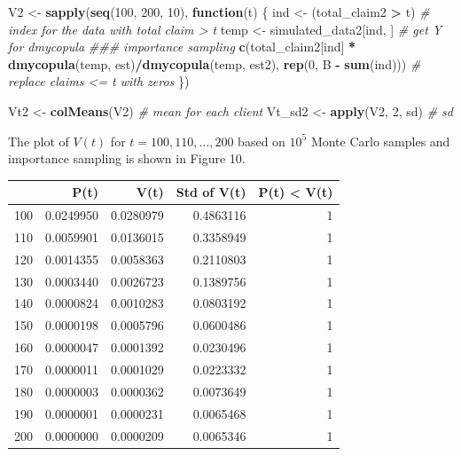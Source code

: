 \documentclass[11pt,]{article}
\newenvironment{Shaded}{\begin{snugshade}}{\end{snugshade}}
\newcommand{\CommentTok}[1]{\textcolor[rgb]{0.56,0.35,0.01}{\textit{#1}}}
\newcommand{\ControlFlowTok}[1]{\textcolor[rgb]{0.13,0.29,0.53}{\textbf{#1}}}
\newcommand{\DecValTok}[1]{\textcolor[rgb]{0.00,0.00,0.81}{#1}}
\newcommand{\KeywordTok}[1]{\textcolor[rgb]{0.13,0.29,0.53}{\textbf{#1}}}
\newcommand{\NormalTok}[1]{#1}
\newcommand{\OperatorTok}[1]{\textcolor[rgb]{0.81,0.36,0.00}{\textbf{#1}}}
\newcommand{\StringTok}[1]{\textcolor[rgb]{0.31,0.60,0.02}{#1}}
\begin{document}
\begin{Shaded}
\begin{Highlighting}[]
\NormalTok{V2 <-}\StringTok{ }\KeywordTok{sapply}\NormalTok{(}\KeywordTok{seq}\NormalTok{(}\DecValTok{100}\NormalTok{, }\DecValTok{200}\NormalTok{, }\DecValTok{10}\NormalTok{), }\ControlFlowTok{function}\NormalTok{(t) \{}
\NormalTok{    ind <-}\StringTok{ }\NormalTok{(total_claim2 }\OperatorTok{>}\StringTok{ }\NormalTok{t)  }\CommentTok{# index for the data with total claim > t}
\NormalTok{    temp <-}\StringTok{ }\NormalTok{simulated_data2[ind, ]  }\CommentTok{# get Y for dmycopula}
    \CommentTok{### importance sampling}
    \KeywordTok{c}\NormalTok{(total_claim2[ind] }\OperatorTok{*}\StringTok{ }\KeywordTok{dmycopula}\NormalTok{(temp, est)}\OperatorTok{/}\KeywordTok{dmycopula}\NormalTok{(temp, est2), }\KeywordTok{rep}\NormalTok{(}\DecValTok{0}\NormalTok{, }
\NormalTok{        B }\OperatorTok{-}\StringTok{ }\KeywordTok{sum}\NormalTok{(ind)))  }\CommentTok{# replace claims <= t with zeros}
\NormalTok{\})}

\NormalTok{Vt2 <-}\StringTok{ }\KeywordTok{colMeans}\NormalTok{(V2)  }\CommentTok{# mean for each client}
\NormalTok{Vt_sd2 <-}\StringTok{ }\KeywordTok{apply}\NormalTok{(V2, }\DecValTok{2}\NormalTok{, sd)  }\CommentTok{# sd}
\end{Highlighting}
\end{Shaded}

The plot of \(V(t)\) for \(t=100,110,…,200\) based on \(10^5\) Monte
Carlo samples and importance sampling is shown in Figure 10.

\begin{longtable}[]{@{}lrrrr@{}}
\toprule
& P(t) & V(t) & Std of V(t) & P(t) \textless{} V(t)\tabularnewline
\midrule
\endhead
100 & 0.0249950 & 0.0280979 & 0.4863116 & 1\tabularnewline
110 & 0.0059901 & 0.0136015 & 0.3358949 & 1\tabularnewline
120 & 0.0014355 & 0.0058363 & 0.2110803 & 1\tabularnewline
130 & 0.0003440 & 0.0026723 & 0.1389756 & 1\tabularnewline
140 & 0.0000824 & 0.0010283 & 0.0803192 & 1\tabularnewline
150 & 0.0000198 & 0.0005796 & 0.0600486 & 1\tabularnewline
160 & 0.0000047 & 0.0001392 & 0.0230496 & 1\tabularnewline
170 & 0.0000011 & 0.0001029 & 0.0223332 & 1\tabularnewline
180 & 0.0000003 & 0.0000362 & 0.0073649 & 1\tabularnewline
190 & 0.0000001 & 0.0000231 & 0.0065468 & 1\tabularnewline
200 & 0.0000000 & 0.0000209 & 0.0065346 & 1\tabularnewline
\bottomrule
\end{longtable}
\end{document}
